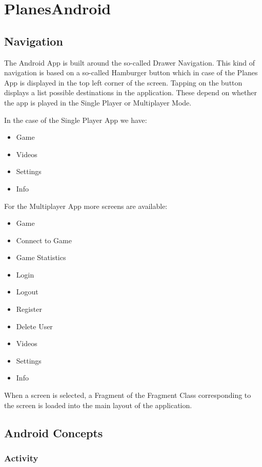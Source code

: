 \section{ PlanesAndroid }

\subsection { Navigation }

The Android App is built around the so-called Drawer Navigation. This kind of navigation is based on a so-called Hamburger button which in case of the Planes App is displayed in the top left corner of the screen. Tapping on the button displays a list possible destinations in the application. These depend on whether the app is played in the Single Player or Multiplayer Mode. 

In the case of the Single Player App we have:
\begin{itemize}
\item Game
\item Videos
\item Settings
\item Info
\end{itemize}

For the Multiplayer App more screens are available:

\begin{itemize}
	\item Game
	\item Connect to Game
	\item Game Statistics
	\item Login
	\item Logout
	\item Register
	\item Delete User
	\item Videos
	\item Settings
	\item Info
\end{itemize}

When a screen is selected, a Fragment of the Fragment Class corresponding to the screen is loaded into the main layout of the application. 

\subsection { Android Concepts }

\subsubsection { Activity }

